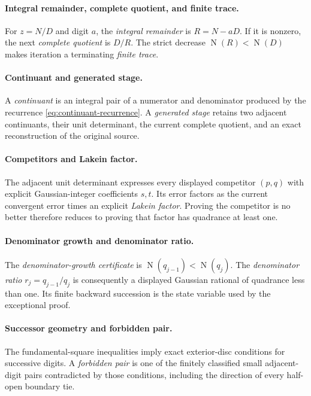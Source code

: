 \documentclass[11pt]{article}
\newcommand{\Norm}[1]{\operatorname{N}\!\left(#1\right)}
\begin{document}
\paragraph{Integral remainder, complete quotient, and finite trace.}
For $z=N/D$ and digit $a$, the \emph{integral remainder} is $R=N-aD$.  If it
is nonzero, the next \emph{complete quotient} is $D/R$.  The strict decrease
$\Norm R<\Norm D$ makes iteration a terminating \emph{finite trace}.

\paragraph{Continuant and generated stage.}
A \emph{continuant} is an integral pair of a numerator and denominator
produced by the recurrence \eqref{eq:continuant-recurrence}.  A \emph{generated stage}
retains two adjacent continuants, their unit determinant, the current complete
quotient, and an exact reconstruction of the original source.

\paragraph{Competitors and Lakein factor.}
The adjacent unit determinant expresses every displayed competitor $(p,q)$
with explicit Gaussian-integer coefficients $s,t$.  Its error factors as the
current convergent error times an explicit \emph{Lakein factor}.  Proving the
competitor is no better therefore reduces to proving that factor has
quadrance at least one.

\paragraph{Denominator growth and denominator ratio.}
The \emph{denominator-growth certificate} is
$\Norm{q_{j-1}}<\Norm{q_j}$.  The \emph{denominator ratio}
$r_j=q_{j-1}/q_j$ is consequently a displayed Gaussian rational of quadrance
less than one.  Its finite backward succession is the state variable used by
the exceptional proof.

\paragraph{Successor geometry and forbidden pair.}
The fundamental-square inequalities imply exact exterior-disc conditions for
successive digits.  A \emph{forbidden pair} is one of the finitely classified
small adjacent-digit pairs contradicted by those conditions, including the
direction of every half-open boundary tie.
\end{document}
